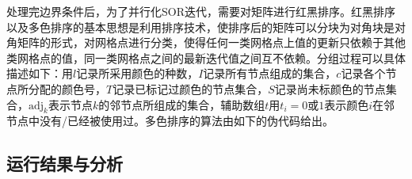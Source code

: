 \documentclass{article}
\begin{document}
处理完边界条件后，为了并行化SOR迭代，需要对矩阵进行红黑排序。红黑排序以及多色排序的基本思想是利用排序技术，使排序后的矩阵可以分块为对角块是对角矩阵的形式，对网格点进行分类，使得任何一类网格点上值的更新只依赖于其他类网格点的值，同一类网格点之间的最新迭代值之间互不依赖。分组过程可以具体描述如下：用$l$记录所采用颜色的种数，$I$记录所有节点组成的集合，$c$记录各个节点所分配的颜色号，$T$记录已标记过颜色的节点集合，$S$记录尚未标颜色的节点集合，$\textrm{adj}_{k}$表示节点$k$的邻节点所组成的集合，辅助数组$t$用$t_{i}=0$或$1$表示颜色$i$在邻节点中没有/已经被使用过。多色排序的算法由如下的伪代码给出。

\subsection{运行结果与分析}
\end{document}
